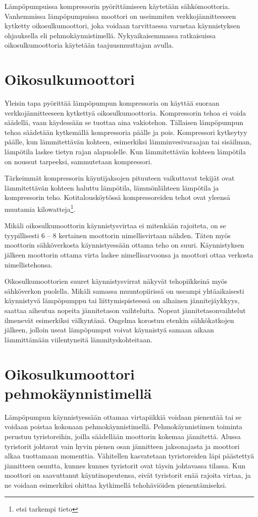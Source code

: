   Lämpöpumpuissa kompressorin pyörittämiseen käytetään sähkömoottoria. Vanhemmissa lämpöpumpuissa moottori on useimmiten verkkojännitteeseen kytketty oikosulkumoottori, joka voidaan tarvittaessa varustaa käynnistyksen ohjauksella eli pehmokäynnistimellä. Nykyaikaisemmassa ratkaisuissa oikosulkumoottoria käytetään taajuusmuuttajan avulla.

\section{Oikosulkumoottori}
  Yleisin tapa pyörittää lämpöpumpun kompressoria on käyttää suoraan verkkojännitteeseen kytkettyä oikosulkumoottoria. Kompressorin tehoa ei voida säädellä, vaan käydessään se tuottaa aina vakiotehon. Tällaisen lämpöpumpun tehoa säädetään kytkemällä kompressoria päälle ja pois. Kompressori kytkeytyy päälle, kun lämmitettävän kohteen, esimerkiksi lämminvesivaraajan tai sisäilman, lämpötila laskee tietyn rajan alapuolelle. Kun lämmitettävän kohteen lämpötila on noussut tarpeeksi, sammutetaan kompressori.

  Tärkeimmät kompressorin käyntijaksojen pituuteen vaikuttavat tekijät ovat lämmitettävän kohteen haluttu lämpötila, lämmönlähteen lämpötila ja kompressorin teho. Kotitalousköytössä kompressoreiden tehot ovat yleensä muutamia kilowatteja\footnote{etsi tarkempi tieto}.

  Mikäli oikosulkumoottorin käynnistysvirtaa ei mitenkään rajoiteta, on se tyypillisesti 6 -- 8 kertainen moottorin nimellisvirtaan nähden. Täten myös moottorin sähköverkosta käynnistyessään ottama teho on suuri.\parencite{pehmokaynnistinopas} Käynnistyksen jälkeen moottorin ottama virta laskee nimellisarvoonsa ja moottori ottaa verkosta nimellistehonsa.

  Oikosulkumoottorien suuret käynnistysvirrat näkyvät tehopiikkeinä myös sähköverkon puolella. Mikäli samassa muuntopiirissä on useampi yhtäaikaisesti käynnistyvä lämpöpumppu tai liittymispisteessä on alhainen jännitejäykkyys, saattaa aiheutua nopeita jännitetason vaihteluita. Nopeat jännitetasonvaihtelut ilmenevät esimerkiksi välkyntänä.\parencite{SFSEN50160} Ongelma korostuu etenkin sähkökatkojen jälkeen, jolloin useat lämpöpumput voivat käynnistyä samaan aikaan lämmittämään viilentyneitä lämmityskohteitaan.

\section{Oikosulkumoottori pehmokäynnistimellä}
  Lämpöpumpun käynnistyessään ottamaa virtapiikkiä voidaan pienentää tai se voidaan poistaa kokonaan pehmokäynnistimellä. Pehmokäynnistimen toiminta perustuu tyristoreihin, joilla säädellään moottorin kokemaa jännitettä. Alussa tyristorit johtavat vain hyvin pienen osan jännitteen jaksonajasta ja moottori alkaa tuottamaan momenttia. Vähitellen kasvatetaan tyristoreiden läpi päästettyä jännitteen osuutta, kunnes kunnes tyristorit ovat täysin johtavassa tilassa. Kun moottori on saavuttanut käyntinopeutensa, eivät tyristorit enää rajoita virtaa, ja ne voidaan esimerkiksi ohittaa kytkimellä tehohäviöiden pienentämiseksi.\parencite{pehmokaynnistinopas}

